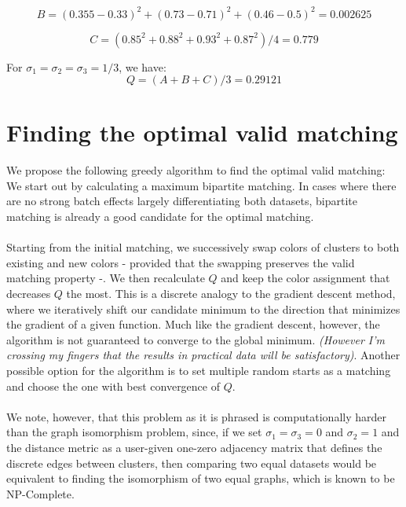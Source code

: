 \documentclass[11pt]{article}
\begin{document}
$$
B = (0.355 - 0.33)^2 + (0.73 - 0.71)^2 + (0.46 - 0.5)^2 = 0.002625
$$

$$
C = (0.85^2 +0.88^2 + 0.93^2 + 0.87^2)/4 = 0.779
$$

For $\sigma_1 = \sigma_2 = \sigma_3 = 1/3$, we have:
$$
Q = (A+B+C)/3 = 0.29121
$$

\section{Finding the optimal valid matching}
We propose the following greedy algorithm to find the optimal valid matching: 
We start out by calculating a maximum bipartite matching. In cases where there are no strong batch effects largely differentiating both datasets, bipartite matching is already a good candidate for the optimal matching. \\
\\
Starting from the initial matching, we successively swap colors of clusters to both existing and new colors - provided that the swapping preserves the valid matching property -. We then recalculate $Q$ and keep the color assignment that decreases $Q$ the most. This is a discrete analogy to the gradient descent method, where we iteratively shift our candidate minimum to the direction that minimizes the gradient of a given function. Much like the gradient descent, however, the algorithm is not guaranteed to converge to the global minimum. \emph{(However I'm crossing my fingers that the results in practical data will be satisfactory)}. Another possible option for the algorithm is to set multiple random starts as a matching and choose the one with best convergence of $Q$. \\
\\
We note, however, that this problem as it is phrased is computationally harder than the graph isomorphism problem, since, if we set $\sigma_1 = \sigma_3 = 0$ and $\sigma_2 = 1$ and the distance metric as a user-given one-zero adjacency matrix that defines the discrete edges between clusters, then comparing two equal datasets would be equivalent to finding the isomorphism  of two equal graphs, which is known to be NP-Complete. 
\\
\end{document}
